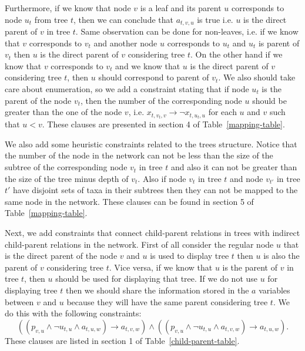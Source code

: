 \documentclass[runningheads, envcountsame, a4paper]{llncs}
\begin{document}
Furthermore, if we know that node $v$ is a leaf and its parent $u$ corresponds to node $u_t$ from tree $t$, 
then we can conclude that $a_{t,v,u}$ is true i.e. $u$ is the direct parent of $v$ in tree $t$. Same observation 
can be done for non-leaves, i.e. if we know that $v$ corresponds to $v_t$ and another node $u$ corresponds to $u_t$ 
and $u_t$ is parent of $v_t$ then $u$ is the direct parent of $v$ considering tree $t$. On the other hand if we know 
that $v$ corresponds to $v_t$ and we know that $u$ is the direct parent of $v$ considering tree $t$, then $u$ should 
correspond to parent of $v_t$. We also should take care about enumeration, so we add a constraint stating that if node 
$u_t$ is the parent of the node $v_t$, then the number of the corresponding node $u$ should be greater than the one of 
the node $v$, i.e. $x_{t,v_t,v} \rightarrow \neg x_{t,u_t,u}$ for each $u$ and $v$ such that $u < v$. These clauses are
presented in section 4 of Table~\ref{mapping-table}.

We also add some heuristic constraints related to the trees structure. Notice that the number of the node in the network 
can not be less than the  size of the subtree of the corresponding node $v_t$ in tree $t$ and also it can not be greater than 
the size of the tree minus depth of $v_t$. Also if node $v_t$ in tree $t$ and node $v_{t'}$ in tree $t'$ have disjoint sets of 
taxa in their subtrees then they can not be mapped to the same node in the network. These clauses can be found in section 5 of 
Table~\ref{mapping-table}.

Next, we add constraints that connect child-parent relations in trees with indirect child-parent relations in 
the network. First of all consider the regular node $u$ that is the direct parent of the node $v$ and $u$ is used 
to display tree $t$ then $u$ is also the parent of $v$ considering tree $t$. 
Vice versa, if we know that $u$ is the parent of $v$ in tree $t$, then 
$u$ should be used for displaying that tree. If we do not use $u$ for displaying tree $t$ then we should share the 
information stored in the $a$ variables between $v$ and $u$ because they will have the same parent considering tree $t$. 
We do this with the following constraints:
$$\left(\left(p_{v,u} \wedge \neg u_{t,u} \wedge a_{t,u,w}\right) \rightarrow a_{t,v,w}\right)
\wedge \left( \left(p_{v,u} \wedge \neg u_{t,u} \wedge a_{t,v,w}\right) \rightarrow a_{t,u,w} \right).$$
These clauses are listed in section 1 of Table~\ref{child-parent-table}.
\end{document}
